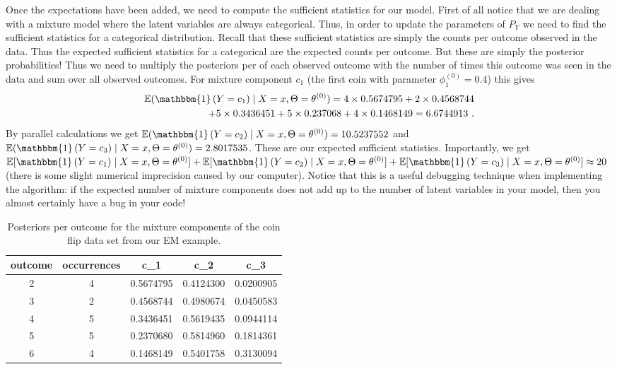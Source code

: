 \documentclass[11pt,leqno,a4paper]{report}\usepackage[]{graphicx}\usepackage[]{color}
\newcommand{\E}{\mathbb{E}}
\newcommand{\id}[1]{\mathbbm{1}\left(#1\right)}
\begin{document}
Once the expectations have been added, we need to compute the sufficient statistics for our model. First of all notice that we are dealing with
a mixture model where the latent variables are always categorical. Thus, in order to update the parameters of $ P_{Y} $ we need to find the
sufficient statistics for a categorical distribution. Recall that these sufficient statistics are simply the counts per outcome observed in
the data. Thus the expected sufficient statistics for a categorical are the expected counts per outcome. But these are simply the posterior
probabilities! Thus we need to multiply the posteriors per of each observed outcome with the number of times this outcome was
seen in the data and sum over all observed outcomes. For mixture component $ c_{1} $ (the first coin with parameter $ \phi^{(0)}_{1} = 0.4 $) this gives
\begin{align}
\E(\id{Y = c_{1}} \mid X=x,\Theta= \theta^{(0)}) = 4 \times 0.5674795 + 2 \times 0.4568744 \label{eq:c1Expectation} \\ 
+ 5 \times 0.3436451 + 5 \times 0.237068 + 4 \times 0.1468149 = 6.6744913 \nonumber \ .
\end{align}
By parallel calculations we get $ \E(\id{Y = c_{2}}\mid X=x,\Theta= \theta^{(0)}) = 10.5237552 $ and $ \E(\id{Y = c_{3}}\mid X=x,\Theta= 
\theta^{(0)}) = 2.8017535 $. 
These are our expected sufficient statistics. Importantly, we get 
$ \E[\id{Y = c_{1}}\mid X=x,\Theta= \theta^{(0)}] + \E[\id{Y = c_{2}}\mid X=x,\Theta= \theta^{(0)}] + \E[\id{Y = c_{3}}\mid X=x,\Theta= \theta^{(0)}] \approx 20 $ (there is some slight numerical imprecision
caused by our computer). Notice that this is a useful debugging technique when implementing the algorithm: if the expected number of mixture components
does not add up to the number of latent variables in your model, then you almost certainly have a bug in your code!
\begin{table}
\center

\begin{tabular}{c|c|c|c|c}
\hline
outcome & occurrences & c\_1 & c\_2 & c\_3\\
\hline
2 & 4 & 0.5674795 & 0.4124300 & 0.0200905\\
\hline
3 & 2 & 0.4568744 & 0.4980674 & 0.0450583\\
\hline
4 & 5 & 0.3436451 & 0.5619435 & 0.0944114\\
\hline
5 & 5 & 0.2370680 & 0.5814960 & 0.1814361\\
\hline
6 & 4 & 0.1468149 & 0.5401758 & 0.3130094\\
\hline
\end{tabular}


\caption{Posteriors per outcome for the mixture components of the coin flip data set from our EM example.}
\label{tab:posteriors}
\end{table}
\end{document}
